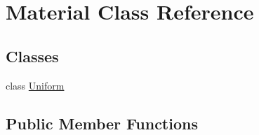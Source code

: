 \hypertarget{class_material}{\section{Material Class Reference}
\label{class_material}
}
\subsection*{Classes}
\begin{DoxyCompactItemize}
\item 
class \hyperlink{class_material_1_1_uniform}{Uniform}
\end{DoxyCompactItemize}
\subsection*{Public Member Functions}

